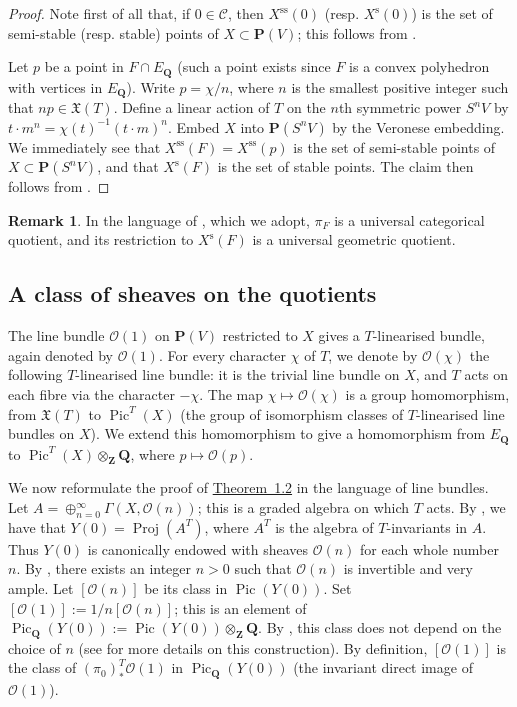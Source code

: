 \documentclass{article}
\theoremstyle{plain}
\theoremstyle{definition}
\newtheorem*{remark}{Remark}
\newcommand{\scr}[1]{{\mathscr{#1}}}
\newcommand{\PP}{\mathbf{P}}
\newcommand{\QQ}{\mathbf{Q}}
\newcommand{\ZZ}{\mathbf{Z}}
\newcommand{\s}{\mathrm{s}}
\renewcommand{\ss}{\mathrm{ss}}
\DeclareMathOperator{\Pic}{Pic}
\DeclareMathOperator{\Proj}{Proj}
\begin{document}
\begin{proof}
  Note first of all that, if $0\in\mathcal{C}$, then $X^\ss(0)$ (resp. $X^\s(0)$) is the set of semi-stable (resp. stable) points of $X\subset\PP(V)$;
  this follows from \cite[Theorem~2.1]{MF}.

  Let $p$ be a point in $F\cap E_\QQ$ (such a point exists since $F$ is a convex polyhedron with vertices in $E_\QQ$).
  Write $p=\chi/n$, where $n$ is the smallest positive integer such that $np\in\mathfrak{X}(T)$.
  Define a linear action of $T$ on the $n$th symmetric power $S^nV$ by $t\cdot m^n = \chi(t)^{-1}(t\cdot m)^n$.
  Embed $X$ into $\PP(S^nV)$ by the Veronese embedding.
  We immediately see that $X^\ss(F)=X^\ss(p)$ is the set of semi-stable points of $X\subset\PP(S^nV)$, and that $X^\s(F)$ is the set of stable points.
  The claim then follows from \cite[1.4]{MF}.
\end{proof}

\begin{remark}
  In the language of \cite[Chapter~1]{MF}, which we adopt, $\pi_F$ is a universal categorical quotient, and its restriction to $X^\s(F)$ is a universal geometric quotient.
\end{remark}


\subsection{A class of sheaves on the quotients}
\label{1.3}

The line bundle $\scr{O}(1)$ on $\PP(V)$ restricted to $X$ gives a $T$-linearised bundle, again denoted by $\scr{O}(1)$.
For every character $\chi$ of $T$, we denote by $\scr{O}(\chi)$ the following $T$-linearised line bundle:
it is the trivial line bundle on $X$, and $T$ acts on each fibre via the character $-\chi$.
The map $\chi\mapsto\scr{O}(\chi)$ is a group homomorphism, from $\mathfrak{X}(T)$ to $\Pic^T(X)$ (the group of isomorphism classes of $T$-linearised line bundles on $X$).
We extend this homomorphism to give a homomorphism from $E_\QQ$ to $\Pic^T(X)\otimes_\ZZ\QQ$, where $p\mapsto\scr{O}(p)$.

We now reformulate the proof of \hyperref[1.2-theorem]{Theorem~1.2} in the language of line bundles.
Let $A=\oplus_{n=0}^\infty\Gamma(X,\scr{O}(n))$;
this is a graded algebra on which $T$ acts.
By \cite[1.11]{MF}, we have that $Y(0)=\Proj(A^T)$, where $A^T$ is the algebra of $T$-invariants in $A$.
Thus $Y(0)$ is canonically endowed with sheaves $\scr{O}(n)$ for each whole number $n$.
By \cite[8.14.4]{EGAII}, there exists an integer $n>0$ such that $\scr{O}(n)$ is invertible and very ample.
Let $[\scr{O}(n)]$ be its class in $\Pic(Y(0))$.
Set $[\scr{O}(1)] := 1/n[\scr{O}(n)]$;
this is an element of $\Pic_\QQ(Y(0)) := \Pic(Y(0))\otimes_\ZZ\QQ$.
By \cite[8.14.12]{EGAII}, this class does not depend on the choice of $n$ (see \cite{Dem} for more details on this construction).
By definition, $[\scr{O}(1)]$ is the class of $(\pi_0)_*^T\scr{O}(1)$ in $\Pic_\QQ(Y(0))$ (the invariant direct image of $\scr{O}(1)$).
\end{document}
